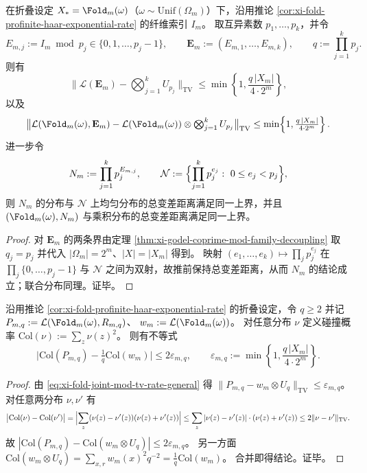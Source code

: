 \begin{corollary}[素数指数寄存器的均匀性与稳定类型独立性]\label{cor:xi-godel-prime-exponent-register-uniform-independence}
在折叠设定 \(X_\ast=\Fold_m(\omega)\)（\(\omega\sim\mathrm{Unif}(\Omega_m)\)）下，沿用推论 \ref{cor:xi-fold-profinite-haar-exponential-rate} 的纤维索引 \(I_m\)。
取互异素数 \(p_1,\dots,p_k\)，并令
\[
E_{m,j}:=I_m\bmod p_j\in\{0,1,\dots,p_j-1\},
\qquad
\mathbf E_m:=(E_{m,1},\dots,E_{m,k}),
\qquad
q:=\prod_{j=1}^k p_j.
\]
则有
\[
\bigl\|\mathcal L(\mathbf E_m)-\textstyle\bigotimes_{j=1}^k U_{p_j}\bigr\|_{\mathrm{TV}}
\le
\min\!\left\{1,\frac{q\,|X_m|}{4\cdot 2^m}\right\},
\]
以及
\[
\bigl\|\mathcal L(\Fold_m(\omega),\mathbf E_m)-\mathcal L(\Fold_m(\omega))\otimes \textstyle\bigotimes_{j=1}^k U_{p_j}\bigr\|_{\mathrm{TV}}
\le
\min\!\left\{1,\frac{q\,|X_m|}{4\cdot 2^m}\right\}.
\]
进一步令
\[
N_m:=\prod_{j=1}^k p_j^{E_{m,j}},
\qquad
\mathcal N:=\Bigl\{\prod_{j=1}^k p_j^{e_j}:\ 0\le e_j<p_j\Bigr\},
\]
则 \(N_m\) 的分布与 \(\mathcal N\) 上均匀分布的总变差距离满足同一上界，并且 \((\Fold_m(\omega),N_m)\) 与乘积分布的总变差距离满足同一上界。
\end{corollary}
\begin{proof}
对 \(\mathbf E_m\) 的两条界由定理 \ref{thm:xi-godel-coprime-mod-family-decoupling} 取 \(q_j=p_j\) 并代入 \(|\Omega_m|=2^m\)、\(|X|=|X_m|\) 得到。
映射 \((e_1,\dots,e_k)\mapsto \prod_j p_j^{e_j}\) 在 \(\prod_j\{0,\dots,p_j-1\}\) 与 \(\mathcal N\) 之间为双射，故推前保持总变差距离，从而 \(N_m\) 的结论成立；联合分布同理。证毕。
\end{proof}

\begin{proposition}[外置模寄存器的碰撞稀释律]\label{prop:xi-godel-mod-register-collision-dilution}
沿用推论 \ref{cor:xi-fold-profinite-haar-exponential-rate} 的折叠设定，令 \(q\ge 2\) 并记
\(
P_{m,q}:=\mathcal L(\Fold_m(\omega),R_{m,q})
\)、
\(
w_m:=\mathcal L(\Fold_m(\omega))
\)。
对任意分布 \(\nu\) 定义碰撞概率
\(
\mathrm{Col}(\nu):=\sum_z \nu(z)^2
\)。
则有不等式
\[
\bigl|\mathrm{Col}(P_{m,q})-\tfrac{1}{q}\mathrm{Col}(w_m)\bigr|
\le
2\varepsilon_{m,q},
\qquad
\varepsilon_{m,q}:=\min\!\left\{1,\frac{q\,|X_m|}{4\cdot 2^m}\right\}.
\]
\end{proposition}
\begin{proof}
由 \eqref{eq:xi-fold-joint-mod-tv-rate-general} 得
\(
\|P_{m,q}-w_m\otimes U_q\|_{\mathrm{TV}}\le \varepsilon_{m,q}
\)。
对任意两分布 \(\nu,\nu'\) 有
\[
\bigl|\mathrm{Col}(\nu)-\mathrm{Col}(\nu')\bigr|
=\Bigl|\sum_z(\nu(z)-\nu'(z))(\nu(z)+\nu'(z))\Bigr|
\le \sum_z|\nu(z)-\nu'(z)|\cdot(\nu(z)+\nu'(z))
\le 2\|\nu-\nu'\|_{\mathrm{TV}}.
\]
故
\(
|\mathrm{Col}(P_{m,q})-\mathrm{Col}(w_m\otimes U_q)|\le 2\varepsilon_{m,q}
\)。
另一方面
\(
\mathrm{Col}(w_m\otimes U_q)=\sum_{x,r}w_m(x)^2q^{-2}=\frac{1}{q}\mathrm{Col}(w_m)
\)。
合并即得结论。证毕。
\end{proof}

